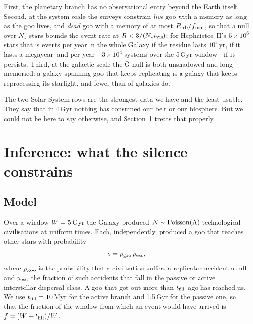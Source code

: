 \documentclass[11pt]{article}
\newcommand{\Ghat}{\^{G}\xspace}
\begin{document}
First, the planetary branch has no observational entry beyond the Earth
itself.  Second, at the system scale the surveys constrain \emph{live} goo
with a memory as long as the goo lives, and \emph{dead} goo with a memory of
at most $P_{\rm orb}/f_{\min}$, so that a null over $N_\star$ stars bounds the
event rate at $R<3/(N_\star t_{\rm vis})$: for Hephaistos~II's
$5\times10^{6}$ stars that is \HephBoundTenK events per year in the whole
Galaxy if the residue lasts $10^{4}$\,yr, \HephBoundMyr if it lasts a
megayear, and \HephBoundTenGyr per year---$3\times10^{4}$ systems over the 5\,Gyr
window---if it persists.  Third, at the galactic scale the \Ghat null is both
unshadowed and long-memoried: a galaxy-spanning goo that keeps replicating is
a galaxy that keeps reprocessing its starlight, and fewer than
\GhatFractionBound of galaxies do.

The two Solar-System rows are the strongest data we have and the least usable.
They say that in 4\,Gyr nothing has consumed our belt or our biosphere.  But we
could not be here to say otherwise, and Section~\ref{sec:inference} treats
that properly.

\section{Inference: what the silence constrains}
\label{sec:inference}

\subsection{Model}

Over a window $W=5$\,Gyr the Galaxy produced $N\sim{\rm Poisson}(\Lambda)$
technological civilisations at uniform times.  Each, independently, produced a
goo that reaches other stars with probability
\begin{equation}
p = p_{\rm goo}\,p_{\rm esc},
\end{equation}
where $p_{\rm goo}$ is the probability that a civilisation suffers a replicator
accident at all and $p_{\rm esc}$ the fraction of such accidents that fall in
the passive or active interstellar dispersal class.  A goo that got out more
than $t_{\rm fill}$ ago has reached us.  We use $t_{\rm fill}=10$\,Myr for the
active branch and 1.5\,Gyr for the passive one, so that the fraction of the
window from which an event would have arrived is $f=(W-t_{\rm fill})/W$.
\end{document}
